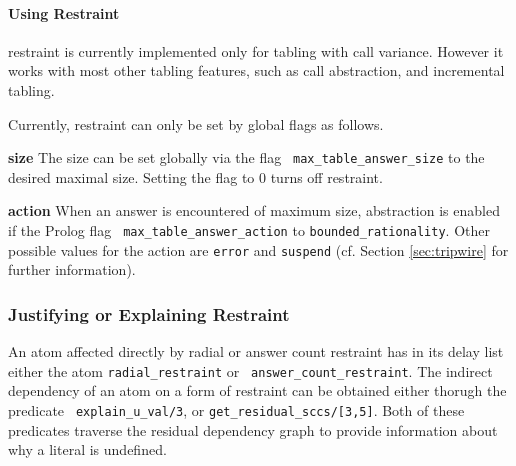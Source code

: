 \paragraph*{Using \MAXANS{} Restraint}
\Maxans{} restraint is currently implemented only for tabling with call
variance.  However it works with most other tabling features, such as
call abstraction, and incremental tabling.

Currently, \maxans{} restraint can only be set by global flags as
follows.
\bi
\item {\bf size} The size can be set globally via the flag {\tt
  max\_table\_answer\_size} to the desired maximal size.  Setting the
  flag to 0 turns off \maxans{} restraint.

\item {\bf action} When an answer is encountered of maximum size,
  abstraction is enabled if the Prolog flag {\tt
    max\_table\_answer\_action} to {\tt bounded\_rationality}.  Other
  possible values for the action are {\tt error} and {\tt suspend}
  (cf. Section \ref{sec:tripwire} for further information).  
\ei

\subsubsection{Justifying or Explaining Restraint}

An atom affected directly by radial or answer count restraint has in
its delay list either the atom {\tt radial\_restraint} or {\tt
  answer\_count\_restraint}.  The indirect dependency of an atom on a
form of restraint can be obtained either thorugh the predicate {\tt
  explain\_u\_val/3}, or {\tt get\_residual\_sccs/[3,5]}.  Both of
these predicates traverse the residual dependency graph to provide
information about why a literal is undefined.





